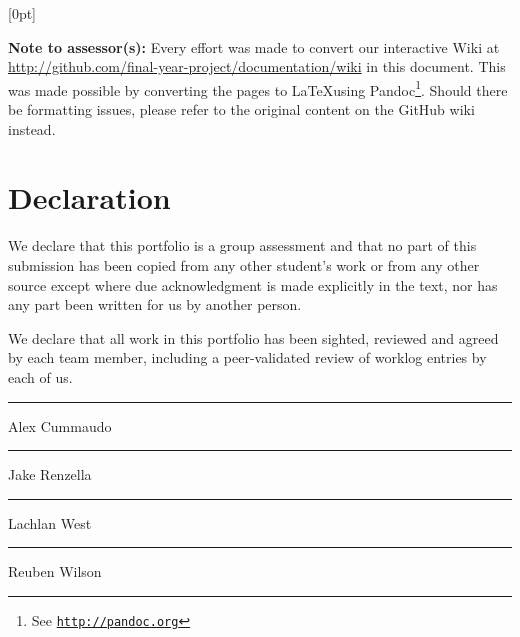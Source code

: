 %
%
\def \unitcode      {SWE40001}
\def \unitname      {Software Engineering Project A}


\usepackage{titletoc}
\linespread{1.5}

  [0pt]%
  {}%
  {\chaptername\ \thecontentslabel\quad}%
  {}%
  {\rmfamily \hfill\contentspage\\}%



\titlepagehere
\cleartoleftpage
\textbf{Note to assessor(s):} Every effort was made to convert our interactive Wiki
at \url{http://github.com/final-year-project/documentation/wiki} in this document.
This was made possible by converting the pages to \LaTeX using Pandoc\footnote{See \texttt{\url{http://pandoc.org}}}. Should there
be formatting issues, please refer to the original content on the GitHub wiki instead.

\cleartoleftpage

\section*{Declaration}

We declare that this portfolio is a group assessment and that no part of this
submission has been copied from any other student's work or from any other
source except where due acknowledgment is made explicitly in the text, nor has
any part been written for us by another person.

We declare that all work in this portfolio has been sighted, reviewed and agreed
by each team member, including a peer-validated review of worklog entries by
each of us.

\vspace{5em}
\noindent
\begin{minipage}{0.24\textwidth}
  \hrule
  \vspace{1em}
  \small
  {Alex Cummaudo}
\end{minipage}%
\hspace{0.0125\textwidth}%
\begin{minipage}{0.24\textwidth}
  \hrule
  \vspace{1em}
  \small
  {Jake Renzella}
\end{minipage}%
\hspace{0.0125\textwidth}%
\begin{minipage}{0.24\textwidth}
  \hrule
  \vspace{1em}
  \small
  {Lachlan West}
\end{minipage}%
\hspace{0.0125\textwidth}%
\begin{minipage}{0.24\textwidth}
  \hrule
  \vspace{1em}
  \small
  {Reuben Wilson}
\end{minipage}%


